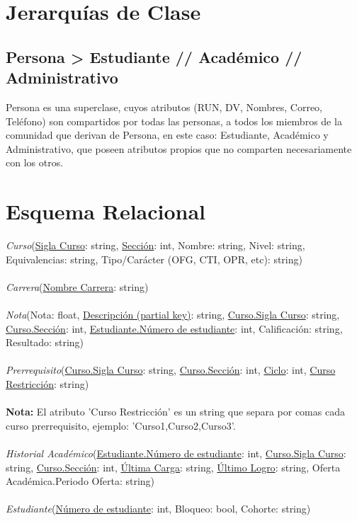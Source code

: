 \documentclass[12pt]{article}
\begin{document}
\section*{Jerarquías de Clase}
\subsection*{Persona \textgreater \; Estudiante // Académico // Administrativo}
Persona es una superclase, cuyos atributos (RUN, DV, Nombres, Correo, Teléfono) son compartidos por todas las personas, a todos los miembros de la comunidad que derivan de Persona, en este caso: Estudiante, Académico y Administrativo, que poseen atributos propios que no comparten necesariamente con los otros. 
\section*{Esquema Relacional}
\textit{Curso}(\underline{Sigla Curso}: string, \underline{Sección}: int, Nombre: string, Nivel: string, Equivalencias: string, Tipo/Carácter (OFG, CTI, OPR, etc): string)\\\\
\textit{Carrera}(\underline{Nombre Carrera}: string)\\\\
\textit{Nota}(Nota: float, \underline{Descripción (partial key)}: string, \underline{Curso.Sigla Curso}: string, \underline{Curso.Sección}: int, \underline{Estudiante.Número de estudiante}: int,
Calificación: string, Resultado: string)\\\\
\textit{Prerrequisito}(\underline{Curso.Sigla Curso}: string, \underline{Curso.Sección}: int, \underline{Ciclo}: int, \underline{Curso Restricción}: string)\\\\
\textbf{Nota:} El atributo 'Curso Restricción' es un string que separa por comas cada curso prerrequisito, ejemplo: 'Curso1,Curso2,Curso3'.\\\\
\textit{Historial Académico}(\underline{Estudiante.Número de estudiante}: int, \underline{Curso.Sigla Curso}: string, \underline{Curso.Sección}: int, \underline{Última Carga}: string, \underline{Último Logro}: string, Oferta Académica.Periodo Oferta: string)\\\\
\textit{Estudiante}(\underline{Número de estudiante}: int, Bloqueo: bool, Cohorte: string)\\\\
\end{document}
